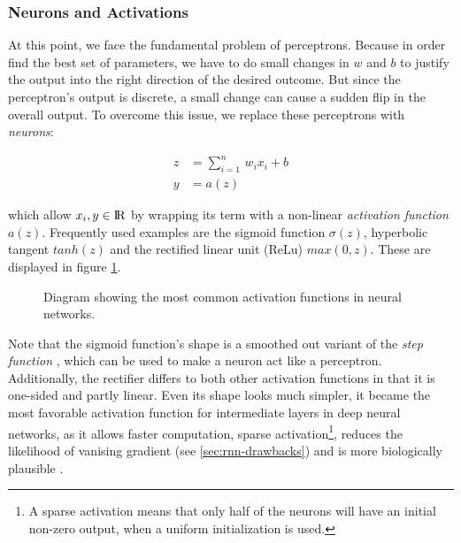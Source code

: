 \subsubsection{Neurons and Activations}

At this point, we face the fundamental problem of perceptrons. Because in order find the best set of parameters, we have to do small changes in $ w $ and $ b $ to justify the output into the right direction of the desired outcome. But since the perceptron's output is discrete, a small change can cause a sudden flip in the overall output. To overcome this issue, we replace these perceptrons with \textit{neurons}:

\begin{equation}
\begin{aligned}
z &= \sum\limits_{i=1}^n \, w_{i}x_{i} + b \\
y &= a(z)
\end{aligned}
\end{equation}

which allow $ x_{i}, y \in \rm I\!R $ by wrapping its term with a non-linear \textit{activation function} $ a(z) $. Frequently used examples are the sigmoid function $ \sigma(z) $, hyperbolic tangent $ tanh(z) $ and the rectified linear unit (ReLu) $ max(0, z) $. These are displayed in figure \ref{fig:activations}.

\begin{figure}[htpb]
  \centering
  \caption[Activation functions]{Diagram showing the most common activation functions in neural networks.}\label{fig:activations}
\end{figure}

Note that the sigmoid function's shape is a smoothed out variant of the \textit{step function} \parencite{neural_nets_deep_learning}, which can be used to make a neuron act like a perceptron. Additionally, the rectifier differs to both other activation functions in that it is one-sided and partly linear. Even its shape looks much simpler, it became the most favorable activation function for intermediate layers in deep neural networks, as it allows faster computation, sparse activation\footnote{{A sparse activation means that only half of the neurons will have an initial non-zero output, when a uniform initialization is used.}}, reduces the likelihood of vanising gradient (see \ref{sec:rnn-drawbacks}) and is more biologically plausible \parencite{relu}.

